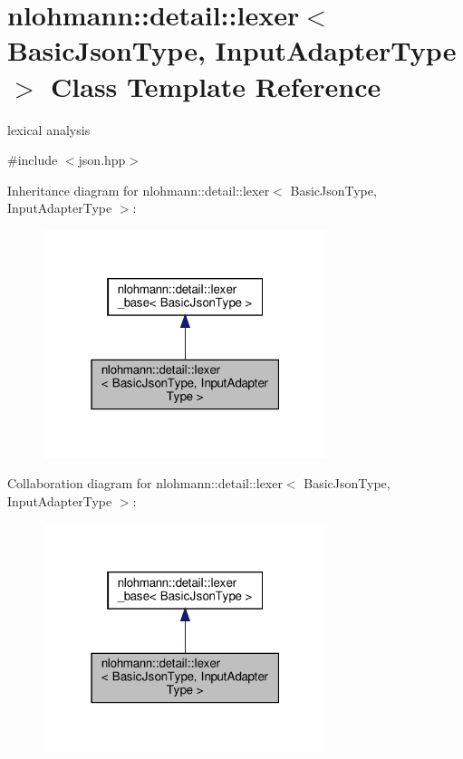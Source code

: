 \hypertarget{classnlohmann_1_1detail_1_1lexer}{}\section{nlohmann\+:\+:detail\+:\+:lexer$<$ Basic\+Json\+Type, Input\+Adapter\+Type $>$ Class Template Reference}
\label{classnlohmann_1_1detail_1_1lexer}


lexical analysis  




{\ttfamily \#include $<$json.\+hpp$>$}



Inheritance diagram for nlohmann\+:\+:detail\+:\+:lexer$<$ Basic\+Json\+Type, Input\+Adapter\+Type $>$\+:
\nopagebreak
\begin{figure}[H]
\begin{center}
\leavevmode
\includegraphics[width=235pt]{classnlohmann_1_1detail_1_1lexer__inherit__graph}
\end{center}
\end{figure}


Collaboration diagram for nlohmann\+:\+:detail\+:\+:lexer$<$ Basic\+Json\+Type, Input\+Adapter\+Type $>$\+:
\nopagebreak
\begin{figure}[H]
\begin{center}
\leavevmode
\includegraphics[width=235pt]{classnlohmann_1_1detail_1_1lexer__coll__graph}
\end{center}
\end{figure}
